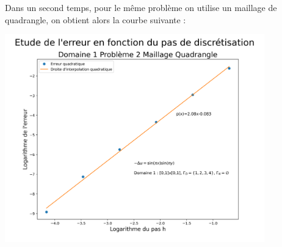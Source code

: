 \documentclass[a4paper, 12pt, french]{report}
\begin{document}
Dans un second temps, pour le même problème on utilise un maillage de quadrangle, on obtient alors la courbe suivante :
\begin{center}
    \includegraphics[height=9cm]{../Images/Courbes_Erreurs/D1P2Q.png}
\end{center}
\end{document}
